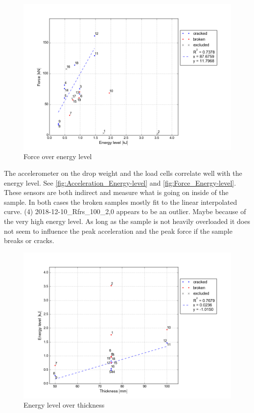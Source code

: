 \begin{figure}
    \centering
    \includegraphics[width=0.95 \linewidth]{./diagram/Force_Energy-level}
    \caption{Force over energy level}
    \label{fig:Force_Energy-level}
\end{figure}

The accelerometer on the drop weight and the load cells correlate well with the energy level. See \autoref{fig:Acceleration_Energy-level} and \autoref{fig:Force_Energy-level}. These sensors are both indirect and measure what is going on inside of the sample. In both cases the broken samples mostly fit to the linear interpolated curve.  (4) 2018-12-10\_Rfrs\_100\_2,0 appears to be an outlier. Maybe because of the very high energy level. As long as the sample is not heavily overloaded it does not seem to influence the peak acceleration and the peak force if the sample breaks or cracks.




\begin{figure}
    \centering
    \includegraphics[width=0.95 \linewidth]{./diagram/Energy-level_Thickness}
    \caption{Energy level over thickness}
    \label{fig:Energy-level_Thickness}
\end{figure}

